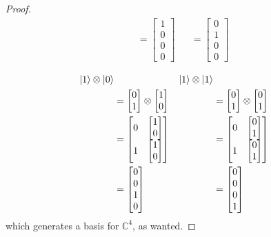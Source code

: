 \documentclass{article}
\renewcommand{\ket}{\Ket}
\theoremstyle{plain}
\theoremstyle{centered}
\renewcommand{\ket}{\Ket}
\newcommand{\tensor}{\otimes}
\newcommand{\bb}[1]{\mathbb{#1}}
\begin{document}
\begin{proof}
\begin{align*}
            &= \begin{bmatrix} 1 \\ 0 \\ 0 \\ 0 \end{bmatrix} & &= \begin{bmatrix} 0 \\ 1 \\ 0 \\ 0 \end{bmatrix}
            \end{align*}

            \begin{align*}
            \ket{1} \tensor \ket{0} & & \ket{1} \tensor \ket{1}\\
            &= \begin{bmatrix} 0 \\ 1 \end{bmatrix} \tensor \begin{bmatrix} 1 \\ 0 \end{bmatrix} & &= \begin{bmatrix} 0 \\ 1 \end{bmatrix} \tensor \begin{bmatrix} 0 \\ 1 \end{bmatrix}\\
            &= \begin{bmatrix} 0 & \begin{bmatrix} 1 \\ 0 \end{bmatrix} \\ 1 & \begin{bmatrix} 1 \\ 0 \end{bmatrix} \end{bmatrix} & &= \begin{bmatrix} 0 & \begin{bmatrix} 0 \\ 1 \end{bmatrix} \\ 1 & \begin{bmatrix} 0 \\ 1 \end{bmatrix} \end{bmatrix}\\
            &= \begin{bmatrix} 0 \\ 0 \\ 1 \\ 0 \end{bmatrix} &&= \begin{bmatrix} 0 \\ 0 \\ 0 \\ 1 \end{bmatrix}
            \end{align*}
            which generates a basis for $\bb{C}^{4}$, as wanted.
        \end{proof}
\end{document}
